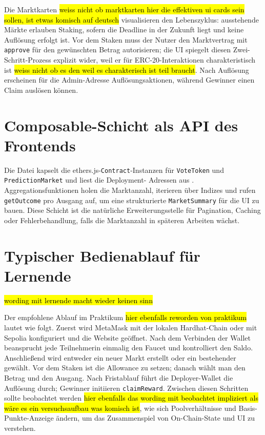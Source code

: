 Die Marktkarten \hl{weiss nicht ob marktkarten hier die effektiven ui cards sein sollen, ist etwas komisch auf deutsch} visualisieren den Lebenszyklus: ausstehende Märkte erlauben
Staking, sofern die Deadline in der Zukunft liegt und keine Auflösung erfolgt ist.
Vor dem Staken muss der Nutzer den Marktvertrag mit \texttt{approve} für den
gewünschten Betrag autorisieren; die UI spiegelt diesen Zwei-Schritt-Prozess
explizit wider, weil er für ERC-20-Interaktionen charakteristisch ist \hl{weiss nicht ob es den weil es charakterisch ist teil braucht}. Nach
Auflösung erscheinen für die Admin-Adresse Auflösungsaktionen, während Gewinner
einen Claim auslösen können.

\section{Composable-Schicht als API des Frontends}

Die Datei  kapselt die ethers.js-\texttt{Contract}-Instanzen
für \texttt{VoteToken} und \texttt{PredictionMarket} und liest die Deployment-
Adressen aus . Aggregationsfunktionen
holen die Marktanzahl, iterieren über Indizes und rufen \texttt{getOutcome}
pro Ausgang auf, um eine strukturierte \texttt{MarketSummary} für die UI zu
bauen. Diese Schicht ist die natürliche Erweiterungsstelle für Pagination,
Caching oder Fehlerbehandlung, falls die Marktanzahl in späteren Arbeiten wächst.

\section{Typischer Bedienablauf für Lernende} \hl{wording mit lernende macht wieder keinen sinn}

Der empfohlene Ablauf im Praktikum \hl{hier ebenfalls reworden von praktikum} lautet wie folgt. Zuerst wird MetaMask mit der
lokalen Hardhat-Chain oder mit Sepolia konfiguriert und die Website geöffnet.
Nach dem Verbinden der Wallet beansprucht jede Teilnehmerin einmalig den Faucet
und kontrolliert den Saldo. Anschließend wird entweder ein neuer Markt erstellt
oder ein bestehender gewählt. Vor dem Staken ist die Allowance zu setzen; danach
wählt man den Betrag und den Ausgang. Nach Fristablauf führt die
Deployer-Wallet die Auflösung durch; Gewinner initiieren \texttt{claimReward}.
Zwischen diesen Schritten sollte beobachtet werden \hl{hier ebenfalls das wording mit beobachtet impliziert als wäre es ein versuchsaufbau was komisch ist}, wie sich Poolverhältnisse und
Basis-Punkte-Anzeige ändern, um das Zusammenspiel von On-Chain-State und UI zu
verstehen.

